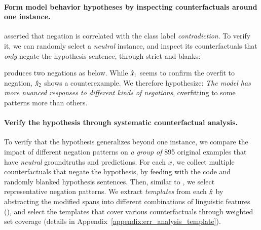 \paragraph{Form model behavior hypotheses by inspecting counterfactuals around one instance.}
\citet{gururangan2018annotation} asserted that negation is correlated with the class label \emph{contradiction}. 
To verify it, we can randomly select a \emph{neutral} instance, and inspect its counterfactuals that \emph{only} negate the hypothesis sentence, through strict \tagstrs and blanks: 


\sysname produces two negations as below.
While $\hat{x}_1$ seems to confirm the overfit to negation, $\hat{x}_2$ shows a counterexample. 
We therefore hypothesize: 
\emph{The model has more nuanced responses to different kinds of negations}, overfitting to some patterns more than others.


\paragraph{Verify the hypothesis through systematic counterfactual analysis.}
To verify that the hypothesis generalizes beyond one instance, we compare the impact of different negation patterns on \emph{a group of} 895 original examples that have \emph{neutral} groundtruths and predictions.
For each $x$, we collect multiple counterfactuals that negate the hypothesis, by feeding \sysname with the  code and randomly blanked hypothesis sentences.
Then, similar to \citet{wu2020tempura}, we select representative negation patterns.
We extract \emph{templates} from each $\hat{x}$ by abstracting the modified spans into different combinations of linguistic features (\eg {}), and select the templates that cover various counterfactuals through weighted set coverage (details in Appendix~\ref{appendix:err_analysis_template}).

